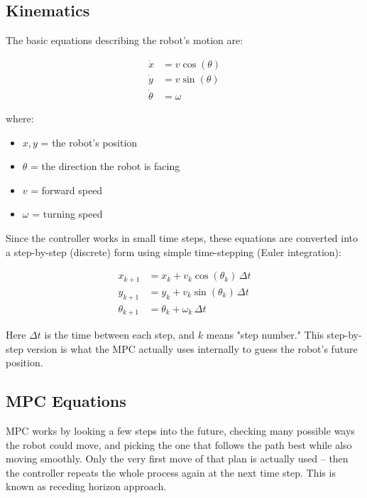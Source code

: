 \subsection{Kinematics}
\label{subsec:mpc_kinematics}

The basic equations describing the robot’s motion are:

\begin{align}
	\dot{x} &= v \cos(\theta) \label{eq:mpc_kinematic_x} \\
	\dot{y} &= v \sin(\theta) \label{eq:mpc_kinematic_y} \\
	\dot{\theta} &= \omega \label{eq:mpc_kinematic_theta}
\end{align}

where:
\begin{itemize}[noitemsep]
	\item $x, y$ = the robot's position
	\item $\theta$ = the direction the robot is facing
	\item $v$ = forward speed
	\item $\omega$ = turning speed
\end{itemize}

Since the controller works in small time steps, these equations are converted into a step-by-step (discrete) form using simple time-stepping (Euler integration):

\begin{align}
	x_{k+1} &= x_k + v_k \cos(\theta_k) \, \Delta t \\
	y_{k+1} &= y_k + v_k \sin(\theta_k) \, \Delta t \\
	\theta_{k+1} &= \theta_k + \omega_k \, \Delta t
\end{align}

Here $\Delta t$ is the time between each step, and $k$ means "step number." This step-by-step version is what the MPC actually uses internally to guess the robot's future position.

\subsection{MPC Equations}
\label{subsec:mpc_equations}

MPC works by looking a few steps into the future, checking many possible ways the robot could move, and picking the one that follows the path best while also moving smoothly. Only the very first move of that plan is actually used -- then the controller repeats the whole process again at the next time step. This is known as receding horizon approach.


